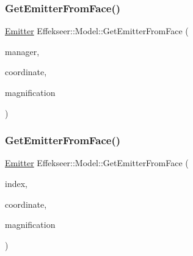 \mbox{\label{class_effekseer_1_1_model_a2b8c3620fca55d7eb3df9f6e91ac11d9}} 
\subsubsection{\texorpdfstring{Get\+Emitter\+From\+Face()}{GetEmitterFromFace()}\hspace{0.1cm}{\footnotesize\ttfamily [1/2]}}
{\footnotesize\ttfamily \mbox{\hyperlink{struct_effekseer_1_1_model_1_1_emitter}{Emitter}} Effekseer\+::\+Model\+::\+Get\+Emitter\+From\+Face (\begin{DoxyParamCaption}\item[{\mbox{\hyperlink{class_effekseer_1_1_manager}{Manager}} $\ast$}]{manager,  }\item[{\mbox{\hyperlink{namespace_effekseer_ac8508f8823c5fcf36aac5d2ddee23765}{Coordinate\+System}}}]{coordinate,  }\item[{float}]{magnification }\end{DoxyParamCaption})\hspace{0.3cm}{\ttfamily [inline]}}

\mbox{\label{class_effekseer_1_1_model_a3d79aac3003fba431ea3c9e815647334}} 
\subsubsection{\texorpdfstring{Get\+Emitter\+From\+Face()}{GetEmitterFromFace()}\hspace{0.1cm}{\footnotesize\ttfamily [2/2]}}
{\footnotesize\ttfamily \mbox{\hyperlink{struct_effekseer_1_1_model_1_1_emitter}{Emitter}} Effekseer\+::\+Model\+::\+Get\+Emitter\+From\+Face (\begin{DoxyParamCaption}\item[{int32\+\_\+t}]{index,  }\item[{\mbox{\hyperlink{namespace_effekseer_ac8508f8823c5fcf36aac5d2ddee23765}{Coordinate\+System}}}]{coordinate,  }\item[{float}]{magnification }\end{DoxyParamCaption})\hspace{0.3cm}{\ttfamily [inline]}}

